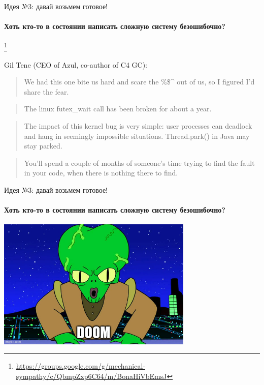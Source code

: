 \begin{frame}[t]{Идея №3: давай возьмем готовое!}
\framesubtitle{Хоть кто-то в состоянии написать сложную систему безошибочно?}

\pause 

\footnote<2->{\tiny\url{https://groups.google.com/g/mechanical-sympathy/c/QbmpZxp6C64/m/BonaHiVbEmsJ}}

\pause
Gil Tene (CEO of Azul, co-author of C4 GC):

\begin{quote}
  We had this one bite us hard and scare the \%\$\^\! out of us, so I figured I'd share the fear.
\end{quote}

\pause

\begin{quote}
The linux futex\_wait call has been broken for about a year.
\end{quote}

\pause

\begin{quote}
The impact of this kernel bug is very simple: user processes can deadlock and hang in seemingly impossible situations. Thread.park() in Java may stay parked.
\end{quote}

\pause

\begin{quote}
You'll spend a couple of months of someone's time trying to find the fault in your code, when there is nothing there to find. 
\end{quote}

\end{frame}


\begin{frame}[t,noframenumbering]{Идея №3: давай возьмем готовое!}
\framesubtitle{Хоть кто-то в состоянии написать сложную систему безошибочно?}

\begin{center}
\includegraphics[width=0.7\textwidth]{production/doom.jpg}
\end{center}

\end{frame}


